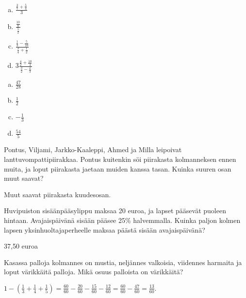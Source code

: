 \begin{multicols}{2}
\begin{tehtava}
        \begin{enumerate}[a)]
        	\item $\displaystyle \frac{\frac{3}{7} + \frac{5}{4}}{3}$
        	\item $\displaystyle \frac{\frac{10}{8}}{\frac{5}{2}}$
        	\item $\displaystyle \frac{\frac{1}{3} - \frac{5}{10}}{\frac{3}{4} + \frac{1}{2}}$
        	\item $\displaystyle 3\frac{\frac{4}{2} + \frac{10}{4}}{\frac{3}{2} - \frac{2}{3}}$
        \end{enumerate}
            \begin{vastaus}		
        		\begin{enumerate}[a)]
        			\item $\frac{47}{28}$
        			\item $\frac{1}{2}$
        			\item $-\frac{1}{3}$
        			\item $\frac{54}{5}$
        		\end{enumerate}
            \end{vastaus}
        \end{tehtava}
    \end{multicols}
    
    \begin{tehtava} %
        Pontus, Viljami, Jarkko-Kaaleppi, Ahmed ja Milla leipoivat lanttuvompattipiirakkaa.
        Pontus kuitenkin söi piirakasta kolmanneksen ennen muita, ja loput piirakasta
        jaetaan muiden kanssa tasan. Kuinka suuren osan muut saavat?
        
        \begin{vastaus}
            Muut saavat piirakasta kuudesosan.
        \end{vastaus}
    \end{tehtava}
    
    \begin{tehtava} %
        Huvipuiston sisäänpääsylippu maksaa 20 euroa, ja lapset pääsevät puoleen
        hintaan. Avajaispäivänä sisään pääsee 25\% halvemmalla. Kuinka paljon kolmen
        lapsen yksinhuoltajaperheelle maksaa päästä sisään avajaispäivänä?
        
        \begin{vastaus}
            37,50 euroa
        \end{vastaus}
    \end{tehtava}
    
    \begin{tehtava}
        Kasassa palloja kolmannes on mustia, neljännes valkoisia, viidennes harmaita ja loput värikkäitä palloja.
        Mikä osuus palloista on värikkäitä?
        
        \begin{vastaus}
            $1-(\frac{1}{3}+\frac{1}{4}+\frac{1}{5})
            = \frac{60}{60}-\frac{20}{60}-\frac{15}{60}-\frac{12}{60}
            = \frac{60}{60}-\frac{47}{60}
            = \frac{13}{60}$.
        \end{vastaus}
    \end{tehtava}
    
